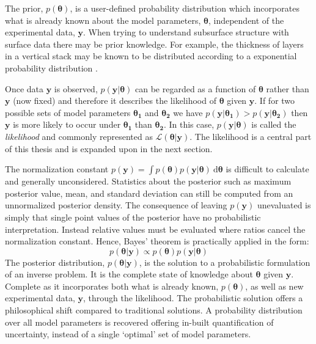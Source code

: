The prior, $p(\bm{\theta})$, is a user-defined probability distribution which incorporates what is already known about the model parameters, $\bm{\theta}$, independent of the experimental data, $\bm{y}$. When trying to understand subsurface structure with surface data there may be prior knowledge. For example, the thickness of layers in a vertical stack may be known to be distributed according to a exponential probability distribution \citep{Mosegaard1995}. \par

Once data $\bm{y}$ is observed, $p(\bm{y}|\bm{\theta})$ can be regarded as a function of $\bm{\theta}$ rather than $\bm{y}$ (now fixed) and therefore it describes the likelihood of $\bm{\theta}$ given $\bm{y}$. If for two possible sets of model parameters $\bm{\theta_1}$ and $\bm{\theta_2}$ we have $p(\bm{y}|\bm{\theta_1}) > p(\bm{y}|\bm{\theta_2})$ then $\bm{y}$ is more likely to occur under $\bm{\theta_1}$ than $\bm{\theta_2}$. In this case, $p(\bm{y}|\bm{\theta})$ is called the \textit{likelihood} and commonly represented as $\mathcal{L}(\bm{\theta}|\bm{y})$. The likelihood is a central part of this thesis and is expanded upon in the next section.\par

The normalization constant $p(\bm{y}) = \int p(\bm{\theta}) p(\bm{y}|\bm{\theta})\ \text{d}\bm{\theta}$ is difficult to calculate and generally unconsidered. Statistics about the posterior such as maximum posterior value, mean, and standard deviation can still be computed from an unnormalized posterior density. The consequence of leaving $p(\bm{y})$ unevaluated is simply that single point values of the posterior have no probabilistic interpretation. Instead relative values must be evaluated where ratios cancel the normalization constant. Hence, Bayes' theorem is practically applied in the form:
\begin{equation}
p(\bm{\theta}|\bm{y}) \propto p(\bm{\theta}) p(\bm{y}|\bm{\theta})
\label{applied_bayes}	
\end{equation}
The posterior distribution, $p(\bm{\theta}|\bm{y})$, is the solution to a probabilistic formulation of an inverse problem. It is the complete state of knowledge about $\bm{\theta}$ given $\bm{y}$. Complete as it incorporates both what is already known, $p(\bm{\theta})$, as well as new experimental data, $\bm{y}$, through the likelihood. The probabilistic solution offers a philosophical shift compared to traditional solutions. A probability distribution over all model parameters is recovered offering in-built quantification of uncertainty, instead of a single `optimal' set of model parameters. \par

